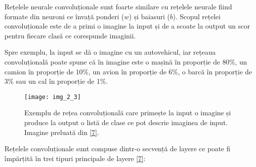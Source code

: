 Rețelele neurale convoluționale sunt foarte similare cu rețelele neurale fiind formate din neuroni ce învață ponderi ($w$) și baiasuri ($b$). Scopul rețelei convoluționale este de a primi o imagine la input și de a scoate la output un scor pentru fiecare clasă ce corespunde imaginii. 

Spre exemplu, la input se dă o imagine cu un autovehicul, iar rețeaua convoluțională poate spune că în imagine este o mașină în proporție de 80\%, un camion în proporție de 10\%, un avion în proporție de 6\%, o barcă în proporție de 3\% sau un cal în proporție de 1\%.

\begin{figure}[!h]
	\centering
	\texttt{[image: img\_2\_3]}
	\caption[Exemplu rețea convoluțională]{Exemplu de rețea convoluțională care primește la input o imagine și produce la output o listă de clase ce pot descrie imaginea de input. Imagine preluată din \hyperlink{datameetsmedia}{[7]}.}
\end{figure} 

Rețelele convoluționale sunt compuse dintr-o secvență de layere ce poate fi împărțită în trei tipuri principale de layere \hyperlink{cs231n}{[7]}:

